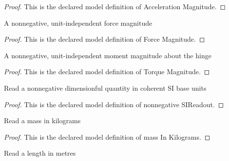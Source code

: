\begin{proof}
  This is the declared model definition of Acceleration Magnitude.
\end{proof}
\begin{definition}
  \label{def:physics:phyx-mini-0953:phyxminiproblems-problemphyxmini0953-forcemagnitude}
  A nonnegative, unit-independent force magnitude
\end{definition}
\begin{proof}
  This is the declared model definition of Force Magnitude.
\end{proof}
\begin{definition}
  \label{def:physics:phyx-mini-0953:phyxminiproblems-problemphyxmini0953-torquemagnitude}
  A nonnegative, unit-independent moment magnitude about the hinge
\end{definition}
\begin{proof}
  This is the declared model definition of Torque Magnitude.
\end{proof}
\begin{definition}
  \label{def:physics:phyx-mini-0953:phyxminiproblems-problemphyxmini0953-nonnegativesireadout}
  Read a nonnegative dimensionful quantity in coherent SI base units
\end{definition}
\begin{proof}
  This is the declared model definition of nonnegative SIReadout.
\end{proof}
\begin{definition}
  \label{def:physics:phyx-mini-0953:phyxminiproblems-problemphyxmini0953-massinkilograms}
  Read a mass in kilograms
\end{definition}
\begin{proof}
  This is the declared model definition of mass In Kilograms.
\end{proof}
\begin{definition}
  \label{def:physics:phyx-mini-0953:phyxminiproblems-problemphyxmini0953-lengthinmeters}
  Read a length in metres
\end{definition}
